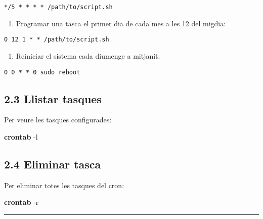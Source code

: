 \documentclass[
  12 pt,
  a4paper,
]{article}
\newenvironment{Shaded}{\begin{snugshade}}{\end{snugshade}}
\newcommand{\AttributeTok}[1]{\textcolor[rgb]{0.13,0.29,0.53}{#1}}
\newcommand{\FunctionTok}[1]{\textcolor[rgb]{0.13,0.29,0.53}{\textbf{#1}}}
\providecommand{\tightlist}{%
  \setlength{\itemsep}{0pt}\setlength{\parskip}{0pt}}
\begin{document}
\begin{verbatim}
*/5 * * * * /path/to/script.sh
\end{verbatim}

\begin{enumerate}
\def\labelenumi{\arabic{enumi}.}
\setcounter{enumi}{1}
\tightlist
\item
  Programar una tasca el primer dia de cada mes a les 12 del migdia:
\end{enumerate}

\begin{verbatim}
0 12 1 * * /path/to/script.sh
\end{verbatim}

\begin{enumerate}
\def\labelenumi{\arabic{enumi}.}
\setcounter{enumi}{2}
\tightlist
\item
  Reiniciar el sistema cada diumenge a mitjanit:
\end{enumerate}

\begin{verbatim}
0 0 * * 0 sudo reboot
\end{verbatim}

\subsection{2.3 Llistar tasques}\label{llistar-tasques}

Per veure les tasques configurades:

\begin{Shaded}
\begin{Highlighting}[]
\FunctionTok{crontab} \AttributeTok{{-}l}
\end{Highlighting}
\end{Shaded}

\subsection{2.4 Eliminar tasca}\label{eliminar-tasca}

Per eliminar totes les tasques del cron:

\begin{Shaded}
\begin{Highlighting}[]
\FunctionTok{crontab} \AttributeTok{{-}r}
\end{Highlighting}
\end{Shaded}

\begin{center}\rule{0.5\linewidth}{0.5pt}\end{center}
\end{document}
